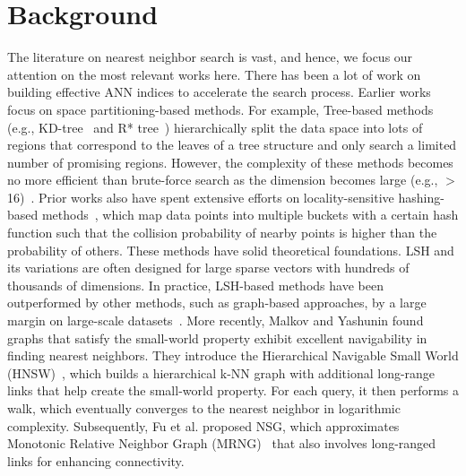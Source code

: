 \vspace{-1em}
\section{Background}\label{minjia_sec:background}

The literature on nearest neighbor search is vast, and hence, we focus our attention on the most relevant works here.  
There has been a lot of work on building effective ANN indices to accelerate the search process. Earlier works focus on space partitioning-based methods. For example, Tree-based methods (e.g., KD-tree~\cite{silpa2008optimised} and R* tree~\cite{r-star-tree}) hierarchically split the data space into lots of regions that correspond to the leaves of a tree structure and only search a limited number of promising regions. However, the complexity of these methods becomes no more efficient than brute-force search as the dimension becomes large (e.g., $>$16)~\cite{worst-case-kdtree}. 
Prior works also have spent extensive efforts on locality-sensitive hashing-based methods~\cite{indyk1998approximate,datar2004locality,andoni2006near,andoni2015practical}, which map data points into multiple buckets with a certain hash function such that the collision probability of nearby points is higher than the probability of others. These methods have solid theoretical foundations. LSH and its variations are often designed for large sparse vectors with hundreds of thousands of dimensions. In practice, LSH-based methods have been outperformed by other methods, such as graph-based approaches, by a large margin on large-scale datasets~\cite{ann-benchmark,hnsw,nsg}. 
More recently, Malkov and Yashunin found graphs that satisfy the small-world property exhibit excellent navigability in finding nearest neighbors. They introduce the Hierarchical Navigable Small World (HNSW)~\cite{hnsw}, which builds a hierarchical k-NN graph with additional long-range links that help create the small-world property. For each query, it then performs a walk, which eventually converges to the nearest neighbor in logarithmic complexity. Subsequently, Fu et al. proposed NSG, which approximates Monotonic Relative Neighbor Graph (MRNG)~\cite{nsg} that also involves long-ranged links for enhancing connectivity. 

